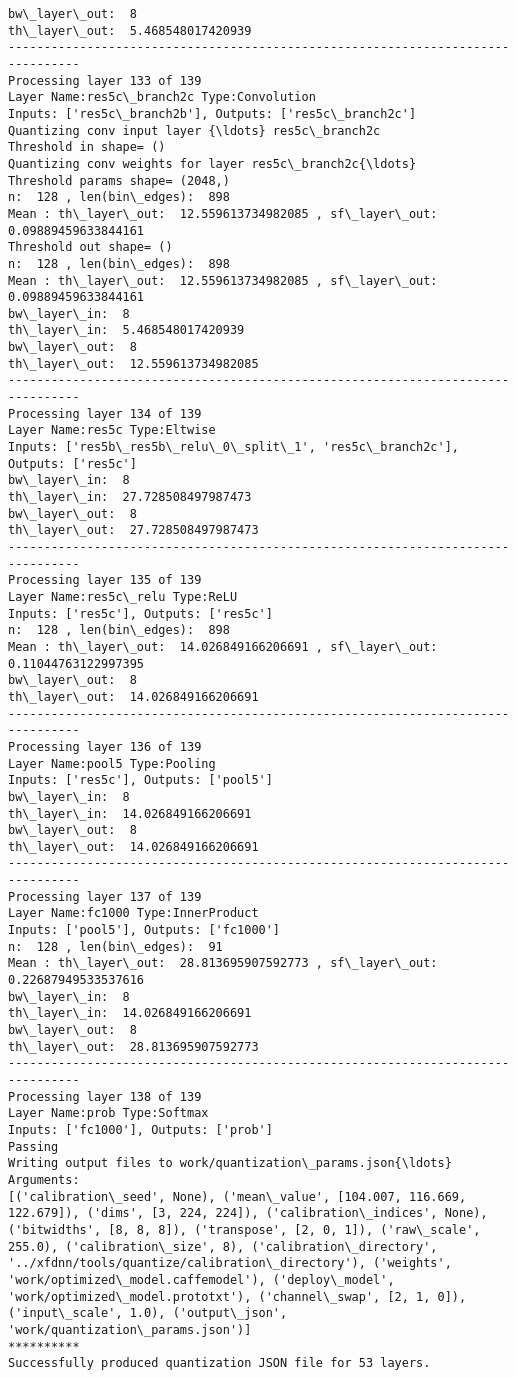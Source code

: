 \documentclass[11pt]{article}
\begin{document}
\begin{Verbatim}[commandchars=\\\{\}]
bw\_layer\_out:  8
th\_layer\_out:  5.468548017420939
--------------------------------------------------------------------------------
Processing layer 133 of 139
Layer Name:res5c\_branch2c Type:Convolution
Inputs: ['res5c\_branch2b'], Outputs: ['res5c\_branch2c']
Quantizing conv input layer {\ldots} res5c\_branch2c
Threshold in shape= ()
Quantizing conv weights for layer res5c\_branch2c{\ldots}
Threshold params shape= (2048,)
n:  128 , len(bin\_edges):  898
Mean : th\_layer\_out:  12.559613734982085 , sf\_layer\_out:  0.09889459633844161
Threshold out shape= ()
n:  128 , len(bin\_edges):  898
Mean : th\_layer\_out:  12.559613734982085 , sf\_layer\_out:  0.09889459633844161
bw\_layer\_in:  8
th\_layer\_in:  5.468548017420939
bw\_layer\_out:  8
th\_layer\_out:  12.559613734982085
--------------------------------------------------------------------------------
Processing layer 134 of 139
Layer Name:res5c Type:Eltwise
Inputs: ['res5b\_res5b\_relu\_0\_split\_1', 'res5c\_branch2c'], Outputs: ['res5c']
bw\_layer\_in:  8
th\_layer\_in:  27.728508497987473
bw\_layer\_out:  8
th\_layer\_out:  27.728508497987473
--------------------------------------------------------------------------------
Processing layer 135 of 139
Layer Name:res5c\_relu Type:ReLU
Inputs: ['res5c'], Outputs: ['res5c']
n:  128 , len(bin\_edges):  898
Mean : th\_layer\_out:  14.026849166206691 , sf\_layer\_out:  0.11044763122997395
bw\_layer\_out:  8
th\_layer\_out:  14.026849166206691
--------------------------------------------------------------------------------
Processing layer 136 of 139
Layer Name:pool5 Type:Pooling
Inputs: ['res5c'], Outputs: ['pool5']
bw\_layer\_in:  8
th\_layer\_in:  14.026849166206691
bw\_layer\_out:  8
th\_layer\_out:  14.026849166206691
--------------------------------------------------------------------------------
Processing layer 137 of 139
Layer Name:fc1000 Type:InnerProduct
Inputs: ['pool5'], Outputs: ['fc1000']
n:  128 , len(bin\_edges):  91
Mean : th\_layer\_out:  28.813695907592773 , sf\_layer\_out:  0.22687949533537616
bw\_layer\_in:  8
th\_layer\_in:  14.026849166206691
bw\_layer\_out:  8
th\_layer\_out:  28.813695907592773
--------------------------------------------------------------------------------
Processing layer 138 of 139
Layer Name:prob Type:Softmax
Inputs: ['fc1000'], Outputs: ['prob']
Passing
Writing output files to work/quantization\_params.json{\ldots}
Arguments:
[('calibration\_seed', None), ('mean\_value', [104.007, 116.669, 122.679]), ('dims', [3, 224, 224]), ('calibration\_indices', None), ('bitwidths', [8, 8, 8]), ('transpose', [2, 0, 1]), ('raw\_scale', 255.0), ('calibration\_size', 8), ('calibration\_directory', '../xfdnn/tools/quantize/calibration\_directory'), ('weights', 'work/optimized\_model.caffemodel'), ('deploy\_model', 'work/optimized\_model.prototxt'), ('channel\_swap', [2, 1, 0]), ('input\_scale', 1.0), ('output\_json', 'work/quantization\_params.json')]
**********
Successfully produced quantization JSON file for 53 layers.


    \end{Verbatim}
\end{document}
